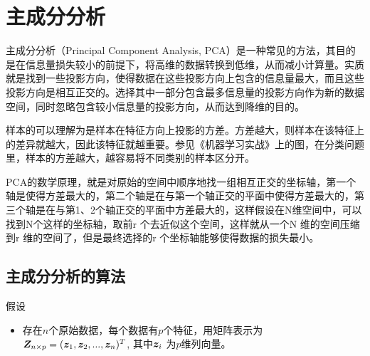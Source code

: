 \chapter{主成分分析}
\label{chap:pca}

主成分分析（Principal Component Analysis, PCA）是一种常见的方法，其目的是在信息量损失较小的前提下，将高维的数据转换到低维，从而减小计算量。实质就是找到一些投影方向，使得数据在这些投影方向上包含的信息量最大，而且这些投影方向是相互正交的。选择其中一部分包含最多信息量的投影方向作为新的数据空间，同时忽略包含较小信息量的投影方向，从而达到降维的目的。

样本的可以理解为是样本在特征方向上投影的方差。方差越大，则样本在该特征上的差异就越大，因此该特征就越重要。参见《机器学习实战》上的图，在分类问题里，样本的方差越大，越容易将不同类别的样本区分开。

PCA的数学原理，就是对原始的空间中顺序地找一组相互正交的坐标轴，第一个轴是使得方差最大的，第二个轴是在与第一个轴正交的平面中使得方差最大的，第三个轴是在与第1、2个轴正交的平面中方差最大的，这样假设在N维空间中，可以找到N个这样的坐标轴，取前r 个去近似这个空间，这样就从一个N 维的空间压缩到r 维的空间了，但是最终选择的r 个坐标轴能够使得数据的损失最小。


\section{主成分分析的算法}
假设
\begin{itemize}
	\item 存在$n$个原始数据，每个数据有$p$个特征，用矩阵表示为${\bm{Z}}_{n \times p}=({\bm{z}}_1,{\bm{z}}_2,...,{\bm{z}}_n)^T$, 其中${\bm{z}}_{i}$ 为$p$维列向量。
\end{itemize}

